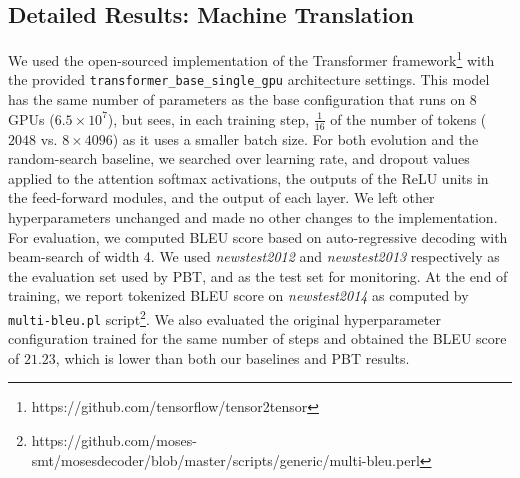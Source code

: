 \begin{appendices}
\subsection{Detailed Results: Machine Translation}
\label{sec:mt_baseline}
We used the open-sourced implementation of the Transformer framework\footnote{https://github.com/tensorflow/tensor2tensor} with the provided \texttt{transformer\_base\_single\_gpu} architecture settings. This model has the same number of parameters as the base configuration that runs on 8 GPUs ($6.5\times10^7$), but sees, in each training step, $\frac{1}{16}$ of the number of tokens ($2048$ vs. $8 \times 4096$) as it uses a smaller batch size. For both evolution and the random-search baseline, we searched over learning rate, and dropout values applied to the attention softmax activations, the outputs of the ReLU units in the feed-forward modules, and the output of each layer. We left other hyperparameters unchanged and made no other changes to the implementation. For evaluation, we computed BLEU score based on auto-regressive decoding with beam-search of width 4. We used \textit{newstest2012} and \textit{newstest2013} respectively as the evaluation set used by PBT, and as the test set for monitoring. At the end of training, we report tokenized BLEU score on \textit{newstest2014} as computed by \texttt{multi-bleu.pl} script\footnote{https://github.com/moses-smt/mosesdecoder/blob/master/scripts/generic/multi-bleu.perl}. We also evaluated the original hyperparameter configuration trained for the same number of steps and obtained the BLEU score of $21.23$, which is lower than both our baselines and PBT results.

\end{appendices}
